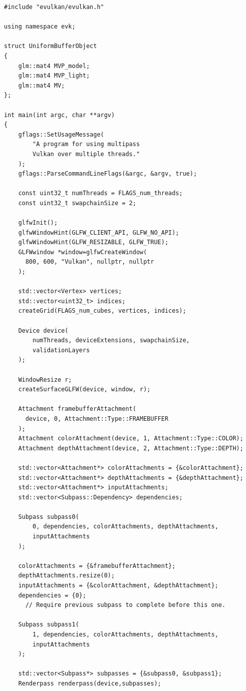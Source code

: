 \documentclass[12pt]{report}
\theoremstyle{definition}
\begin{document}
      \begin{lstlisting}[caption=Multipass drawing with evulkan library., showstringspaces=false]
#include "evulkan/evulkan.h"

using namespace evk;

struct UniformBufferObject
{
    glm::mat4 MVP_model;
    glm::mat4 MVP_light;
    glm::mat4 MV;
};

int main(int argc, char **argv)
{
    gflags::SetUsageMessage(
        "A program for using multipass 
        Vulkan over multiple threads."
    );
    gflags::ParseCommandLineFlags(&argc, &argv, true);

    const uint32_t numThreads = FLAGS_num_threads;
    const uint32_t swapchainSize = 2;

    glfwInit();
    glfwWindowHint(GLFW_CLIENT_API, GLFW_NO_API);
    glfwWindowHint(GLFW_RESIZABLE, GLFW_TRUE);
    GLFWwindow *window=glfwCreateWindow(
      800, 600, "Vulkan", nullptr, nullptr
    );

    std::vector<Vertex> vertices;
    std::vector<uint32_t> indices;
    createGrid(FLAGS_num_cubes, vertices, indices);

    Device device(
        numThreads, deviceExtensions, swapchainSize,
        validationLayers
    );

    WindowResize r;
    createSurfaceGLFW(device, window, r);

    Attachment framebufferAttachment(
      device, 0, Attachment::Type::FRAMEBUFFER
    );
    Attachment colorAttachment(device, 1, Attachment::Type::COLOR);
    Attachment depthAttachment(device, 2, Attachment::Type::DEPTH);

    std::vector<Attachment*> colorAttachments = {&colorAttachment};
    std::vector<Attachment*> depthAttachments = {&depthAttachment};
    std::vector<Attachment*> inputAttachments;
    std::vector<Subpass::Dependency> dependencies;

    Subpass subpass0(
        0, dependencies, colorAttachments, depthAttachments,
        inputAttachments
    );

    colorAttachments = {&framebufferAttachment};
    depthAttachments.resize(0);
    inputAttachments = {&colorAttachment, &depthAttachment};
    dependencies = {0};
      // Require previous subpass to complete before this one.

    Subpass subpass1(
        1, dependencies, colorAttachments, depthAttachments,
        inputAttachments
    );

    std::vector<Subpass*> subpasses = {&subpass0, &subpass1};
    Renderpass renderpass(device,subpasses);


\end{lstlisting}
\end{document}
